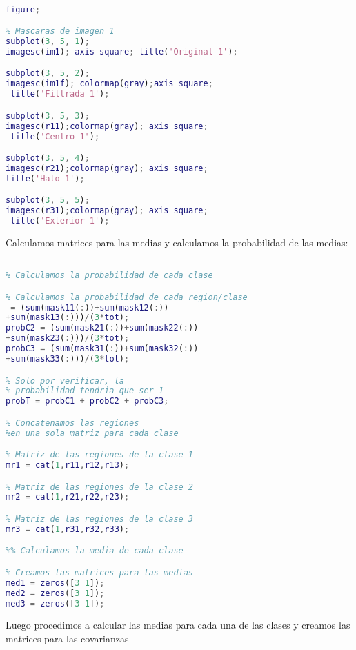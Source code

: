\documentclass[10pt,journal,compsoc]{IEEEtran}\usepackage[T1]{fontenc}                              %
\begin{document}
\begin{lstlisting}[language=Matlab,basicstyle=\small]
% Desplegamos imagenes filtradas

figure;

% Mascaras de imagen 1
subplot(3, 5, 1);
imagesc(im1); axis square; title('Original 1');

subplot(3, 5, 2);
imagesc(im1f); colormap(gray);axis square;
 title('Filtrada 1');

subplot(3, 5, 3);
imagesc(r11);colormap(gray); axis square;
 title('Centro 1');

subplot(3, 5, 4);
imagesc(r21);colormap(gray); axis square; 
title('Halo 1');

subplot(3, 5, 5);
imagesc(r31);colormap(gray); axis square;
 title('Exterior 1');

\end{lstlisting}


Calculamos matrices para las medias y calculamos la probabilidad de las medias:

\begin{lstlisting}[language=Matlab, basicstyle=\small]

% Calculamos la probabilidad de cada clase

% Calculamos la probabilidad de cada region/clase
 = (sum(mask11(:))+sum(mask12(:))
+sum(mask13(:)))/(3*tot);
probC2 = (sum(mask21(:))+sum(mask22(:))
+sum(mask23(:)))/(3*tot);
probC3 = (sum(mask31(:))+sum(mask32(:))
+sum(mask33(:)))/(3*tot);

% Solo por verificar, la
% probabilidad tendria que ser 1
probT = probC1 + probC2 + probC3;

% Concatenamos las regiones 
%en una sola matriz para cada clase

% Matriz de las regiones de la clase 1
mr1 = cat(1,r11,r12,r13);

% Matriz de las regiones de la clase 2
mr2 = cat(1,r21,r22,r23);

% Matriz de las regiones de la clase 3
mr3 = cat(1,r31,r32,r33);

%% Calculamos la media de cada clase

% Creamos las matrices para las medias
med1 = zeros([3 1]);
med2 = zeros([3 1]);
med3 = zeros([3 1]);

\end{lstlisting}


Luego procedimos a calcular las medias para cada una de las clases y creamos las matrices para las covarianzas
\end{document}
